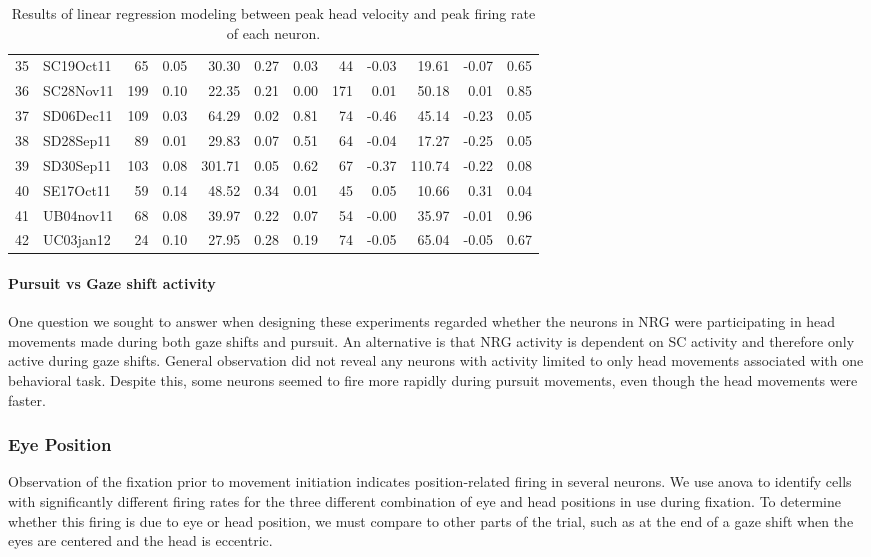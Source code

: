 \documentclass[]{article}
\begin{document}
\begin{table}[ht]
\begin{tabular}{rlrrrrrrrrrr}
  35 & SC19Oct11 &  65 & 0.05 & 30.30 & 0.27 & 0.03 &  44 & -0.03 & 19.61 & -0.07 & 0.65 \\ 
  36 & SC28Nov11 & 199 & 0.10 & 22.35 & 0.21 & 0.00 & 171 & 0.01 & 50.18 & 0.01 & 0.85 \\ 
  37 & SD06Dec11 & 109 & 0.03 & 64.29 & 0.02 & 0.81 &  74 & -0.46 & 45.14 & -0.23 & 0.05 \\ 
  38 & SD28Sep11 &  89 & 0.01 & 29.83 & 0.07 & 0.51 &  64 & -0.04 & 17.27 & -0.25 & 0.05 \\ 
  39 & SD30Sep11 & 103 & 0.08 & 301.71 & 0.05 & 0.62 &  67 & -0.37 & 110.74 & -0.22 & 0.08 \\ 
  40 & SE17Oct11 &  59 & 0.14 & 48.52 & 0.34 & 0.01 &  45 & 0.05 & 10.66 & 0.31 & 0.04 \\ 
  41 & UB04nov11 &  68 & 0.08 & 39.97 & 0.22 & 0.07 &  54 & -0.00 & 35.97 & -0.01 & 0.96 \\ 
  42 & UC03jan12 &  24 & 0.10 & 27.95 & 0.28 & 0.19 &  74 & -0.05 & 65.04 & -0.05 & 0.67 \\ 
   \hline
\end{tabular}
\caption{Results of linear regression modeling between peak head velocity and peak firing rate of each neuron. } 
\end{table}

\paragraph{Pursuit vs Gaze shift
activity}\label{pursuit-vs-gaze-shift-activity}

One question we sought to answer when designing these experiments
regarded whether the neurons in NRG were participating in head movements
made during both gaze shifts and pursuit. An alternative is that NRG
activity is dependent on SC activity and therefore only active during
gaze shifts. General observation did not reveal any neurons with
activity limited to only head movements associated with one behavioral
task. Despite this, some neurons seemed to fire more rapidly during
pursuit movements, even though the head movements were faster.

\subsubsection{Eye Position}\label{eye-position}

Observation of the fixation prior to movement initiation indicates
position-related firing in several neurons. We use anova to identify
cells with significantly different firing rates for the three different
combination of eye and head positions in use during fixation. To
determine whether this firing is due to eye or head position, we must
compare to other parts of the trial, such as at the end of a gaze shift
when the eyes are centered and the head is eccentric.
\end{document}
